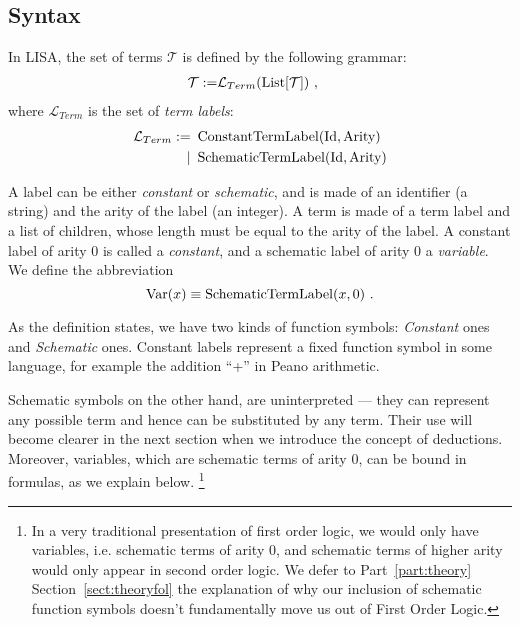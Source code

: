 \subsection{Syntax}
\begin{defin}[Terms]
  In LISA, the set of terms $\mathcal{T}$ is defined by the following grammar:
  \begin{align}
      \mathcal{T} := & \mathcal{L}_{Term}(\operatorname{List}[\mathcal{T}])~,
  \end{align}
  where $\mathcal{L}_{Term}$ is the set of \textit{term labels}:
  \begin{align}
      \mathcal{L}_{Term} := & ~\operatorname{ConstantTermLabel}(\textnormal{Id}, \textnormal{Arity})\\
      \mid & ~\operatorname{SchematicTermLabel}(\textnormal{Id}, \textnormal{Arity})
  \end{align}

  A label can be either \textit{constant} or \textit{schematic}, and is made of an identifier (a string) and the arity of the label (an integer).
  A term is made of a term label and a list of children, whose length must be equal to the arity of the label.
  A constant label of arity $0$ is called a \emph{constant}, and a schematic label of arity $0$ a \emph{variable}. 
  We define the abbreviation 
  $$
    \operatorname{Var}(x) \equiv \operatorname{SchematicTermLabel}(x, 0)~.
  $$
\end{defin}

As the definition states, we have two kinds of function symbols: \textit{Constant} ones and \textit{Schematic} ones. Constant labels represent a fixed function symbol in some language, for example the addition ``+'' in Peano arithmetic.

Schematic symbols on the other hand, are uninterpreted --- they can represent any possible term and hence can be substituted by any term. Their use will become clearer in the next section when we introduce the concept of deductions.  Moreover, variables, which are schematic terms of arity 0, can be bound in formulas, as we explain below. \footnote{In a very traditional presentation of first order logic, we would only have variables, i.e. schematic terms of arity 0, and schematic terms of higher arity would only appear in second order logic. We defer to Part~\ref{part:theory} Section~\ref{sect:theoryfol} the explanation of why our inclusion of schematic function symbols doesn't fundamentally move us out of First Order Logic.}



